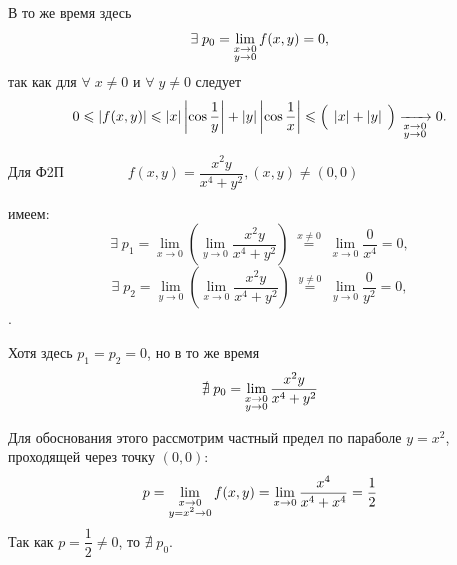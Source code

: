 \begin{examples}
    В то же время здесь
    \begin{equation*}
        \exists \; p_0 = \lim\limits_{ \substack{ x \to 0 \\ y \to 0 } } f(x,y) = 0,
    \end{equation*}
    так как для $ \forall \; x \neq 0 $ и $ \forall \; y \neq 0 $ следует
    \begin{equation*}
        0 \leqslant \left\lvert f(x,y) \right\rvert \leqslant \left\lvert x \right\rvert \left\lvert \cos \dfrac{1}{y} \right\rvert + \left\lvert y \right\rvert \left\lvert \cos \dfrac{1}{x} \right\rvert \leqslant
        \left( \dfrac{ }{} \left\lvert x \right\rvert + \left\lvert y \right\rvert \dfrac{ }{} \right) \xrightarrow[\substack{x \to 0 \\ y \to 0}]{} 0.
    \end{equation*}

    \item Для Ф2П $ \;\;\;\;\;\;\;\;\;\;\;\;\;\; $
    $ f(x,y)  = \dfrac{x^2 y}{x^4+y^2}, (x,y) \neq (0,0)  $

    имеем:
    \begin{equation*}
        \exists \; p_1 = \lim\limits_{x \to 0} \left(\lim\limits_{y \to 0} \dfrac{x^2 y}{x^4+y^2} \right)
        \;\overset{x \neq 0}{=}\;
        \lim\limits_{x \to 0} \dfrac{0}{x^4} = 0,
    \end{equation*}
    \begin{equation*}
        \exists \; p_2 = \lim\limits_{y \to 0} \left(\lim\limits_{x \to 0} \dfrac{x^2 y}{x^4+y^2} \right)
        \;\overset{y \neq 0}{=}\;
        \lim\limits_{y \to 0} \dfrac{0}{y^2} = 0,
    \end{equation*}.

    Хотя здесь $ p_1 = p_2 = 0 $, но в то же время
    \begin{equation*}
         \nexists \; p_0 = \lim\limits_{ \substack{ x \to 0 \\ y \to 0 } } \dfrac{x^2 y}{x^4+y^2}
    \end{equation*}

    Для обоснования этого рассмотрим частный предел по параболе $ y = x^2 $, проходящей через точку $ (0, 0) $:
    \begin{equation*}
       p = \lim\limits_{ \substack{ x \to 0 \\ y = x^2 \to 0 } }
        f(x,y) = \lim\limits_{x \to 0} \dfrac{x^4}{x^4 + x^4} = \dfrac{1}{2}
    \end{equation*}
    Так как $ p = \dfrac{1}{2} \neq 0 $, то $ \nexists \; p_0 $.
\end{examples}

